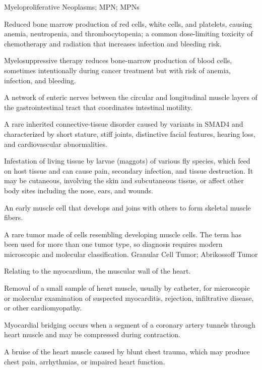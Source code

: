 \synonyms
Myeloproliferative Neoplasms; MPN; MPNs

 Reduced bone marrow production of red cells, white cells, and platelets, causing anemia,
neutropenia, and thrombocytopenia; a common dose-limiting toxicity of chemotherapy and
radiation that increases infection and bleeding risk.

 Myelosuppressive therapy reduces bone-marrow production of blood cells, sometimes intentionally during cancer treatment but with risk of anemia, infection, and bleeding.

 A network of enteric nerves between the circular and longitudinal muscle layers of the gastrointestinal tract that coordinates intestinal motility.

 A rare inherited connective-tissue disorder caused by variants in SMAD4 and characterized by short stature, stiff joints, distinctive facial features, hearing loss, and cardiovascular abnormalities.

 Infestation of living tissue by larvae (maggots) of various fly species, which feed on
host tissue and can cause pain, secondary infection, and tissue destruction. It may be
cutaneous, involving the skin and subcutaneous tissue, or affect other body sites
including the nose, ears, and wounds.

 An early muscle cell that develops and joins with others to form skeletal muscle fibers.

 A rare tumor made of cells resembling developing muscle cells. The term has been used for more than one tumor type, so diagnosis requires modern microscopic and molecular classification.
\synonyms
Granular Cell Tumor; Abrikossoff Tumor

 Relating to the myocardium, the muscular wall of the heart.

 Removal of a small sample of heart muscle, usually by catheter, for microscopic or molecular examination of suspected myocarditis, rejection, infiltrative disease, or other cardiomyopathy.

 Myocardial bridging occurs when a segment of a coronary artery tunnels through heart muscle and may be compressed during contraction.

 A bruise of the heart muscle caused by blunt chest trauma, which may produce chest pain, arrhythmias, or impaired heart function.

